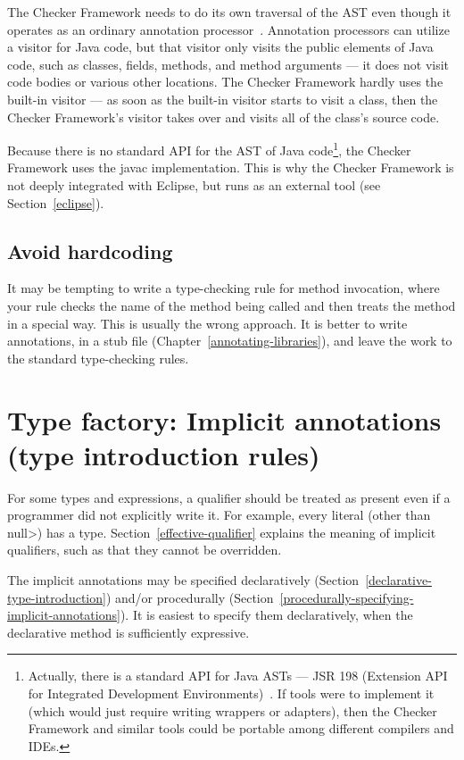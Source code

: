 The Checker Framework needs to do its own traversal of the AST even though
it operates as an ordinary annotation processor~\cite{JSR269}.  Annotation
processors can utilize a visitor for Java code, but that visitor only
visits the public elements of Java code, such as classes, fields, methods,
and method arguments --- it does not visit code bodies or various other
locations.  The Checker Framework hardly uses the built-in visitor --- as
soon as the built-in visitor starts to visit a class, then the Checker
Framework's visitor takes over and visits all of the class's source code.

Because there is no standard API for the AST of Java code\footnote{Actually,
there is a standard API for Java ASTs --- JSR 198 (Extension API for
Integrated Development Environments)~\cite{JSR198}.  If tools were to
implement it
(which would just require writing wrappers or adapters), then the Checker
Framework and similar tools could be portable among different compilers and
IDEs.}, the Checker
Framework uses the javac implementation.  This is why the Checker Framework
is not deeply integrated with Eclipse, but runs as an external tool (see
Section~\ref{eclipse}).


\subsection{Avoid hardcoding\label{avoid-hardcoding}}

It may be tempting to write a type-checking rule for method invocation,
where your rule checks the name of the method being called and then treats
the method in a special way.  This is usually the wrong approach.  It
is better to write annotations, in a stub file
(Chapter~\ref{annotating-libraries}), and leave the work to the standard
type-checking rules.


\section{Type factory: Implicit annotations (type introduction rules)\label{writing-type-introduction}}

For some types and expressions, a qualifier should be treated as present
even if a programmer did not explicitly write it.  For example, every
literal (other than \<null>) has a  type.
Section~\ref{effective-qualifier} explains the meaning of implicit
qualifiers, such as that they cannot be overridden.

The implicit annotations may be specified declaratively
(Section~\ref{declarative-type-introduction}) and/or procedurally
(Section~\ref{procedurally-specifying-implicit-annotations}).
It is easiest to specify them declaratively, when the declarative method is
sufficiently expressive.



